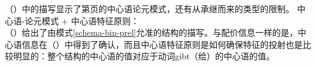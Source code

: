 （）中的描写显示了第\pageref{schema-bin-prel}页的中心语论元模式，还有从承继而来的类型的限制。
\eas
\label{head-arg-schema-hfp}
中心语-论元模式 $+$ 中心语特征原则：\\
\zs
（）给出了由模式\ref{schema-bin-prel}允准的结构的描写。与配价信息一样的是，中心语信息在（）中得到了确认，而且中心语特征原则是如何确保特征的投射也是比较明显的：整个结构的中心语的值对应于动词gibt（给）的中心语的值。
\ea
